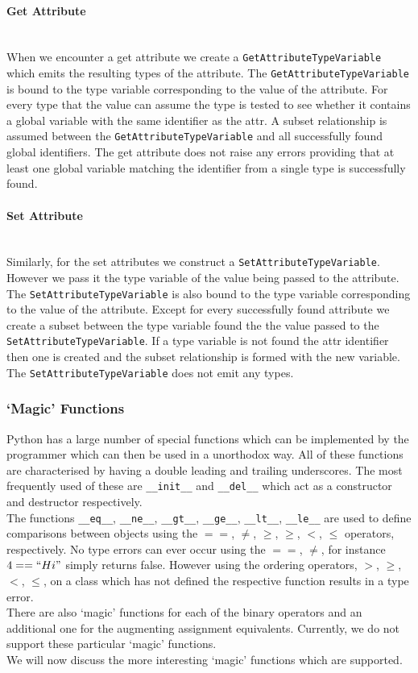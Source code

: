 \documentclass[12pt, titlepage]{article}
\begin{document}
\paragraph*{Get Attribute}\mbox{} \\
When we encounter a get attribute we create a \texttt{GetAttributeTypeVariable} which emits the resulting types of the attribute. The \texttt{GetAttributeTypeVariable} is bound to the type variable corresponding to the value of the attribute. For every type that the value can assume the type is tested to see whether it contains a global variable with the same identifier as the attr. A subset relationship is assumed between the \texttt{GetAttributeTypeVariable} and all successfully found global identifiers. The get attribute does not raise any errors providing that at least one global variable matching the identifier from a single type is successfully found.

\paragraph*{Set Attribute}\mbox{} \\
Similarly, for the set attributes we construct a \texttt{SetAttributeTypeVariable}. However we pass it the type variable of the value being passed to the attribute. The \texttt{SetAttributeTypeVariable} is also bound to the type variable corresponding to the value of the attribute. Except for every successfully found attribute we create a subset between the type variable found the the value passed to the \texttt{SetAttributeTypeVariable}. If a type variable is not found the attr identifier then one is created and the subset relationship is formed with the new variable. The \texttt{SetAttributeTypeVariable} does not emit any types.


\subsubsection{`Magic' Functions}
Python has a large number of special functions which can be implemented by the programmer which can then be used in a unorthodox way. All of these functions are characterised by having a double leading and trailing underscores. The most frequently used of these are \texttt{\_\_init\_\_} and \texttt{\_\_del\_\_} which act as a constructor and destructor respectively. \\
\indent The functions \texttt{\_\_eq\_\_}, \texttt{\_\_ne\_\_}, \texttt{\_\_gt\_\_}, \texttt{\_\_ge\_\_}, \texttt{\_\_lt\_\_}, \texttt{\_\_le\_\_} are used to define comparisons between objects using the $==$, $\neq$, $\ge$, $\geq$, $<$, $\leq$ operators, respectively. No type errors can ever occur using the $==$, $\neq$, for instance $4 == ``Hi"$ simply returns false. However using the ordering operators, $>$, $\geq$, $<$, $\leq$, on a class which has not defined the respective function results in a type error. \\
There are also `magic' functions for each of the binary operators and an additional one for the augmenting assignment equivalents. Currently, we do not support these particular `magic' functions. \\
\indent We will now discuss the more interesting `magic' functions which are supported.
\end{document}
